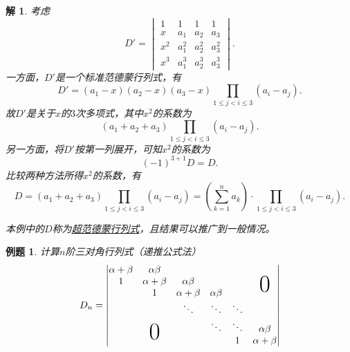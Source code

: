 \documentclass[a4paper]{book}
\newtheorem{eg}{例题}[chapter]
\newtheorem*{solution}{解}
\begin{document}
\begin{solution}
考虑
$$D' = \begin{vmatrix}
1 & 1 & 1 & 1 \\ x &  a_1 & a_2 & a_3 \\ x^2 & a_1^2 & a_2^2 & a_3^2 \\ x^3 & a_1^3 & a_2^3 & a_3^3
\end{vmatrix}.$$
一方面，$D'$是一个标准范德蒙行列式，有
$$D' = (a_1-x)(a_2-x)(a_3-x)\prod_{1\leqslant j < i \leqslant 3} (a_i - a_j).$$
故$D'$是关于$x$的$3$次多项式，其中$x^2$的系数为
$$(a_1+a_2+a_3)\prod_{1\leqslant j < i \leqslant 3} (a_i - a_j).$$
另一方面，将$D'$按第一列展开，可知$x^2$的系数为
$$(-1)^{3+1}D = D.$$
比较两种方法所得$x^2$的系数，有
$$D = (a_1+a_2+a_3)\prod_{1\leqslant j < i \leqslant 3} (a_i - a_j) = \left(\sum\limits_{k=1}^n a_k\right)\cdot\prod_{1\leqslant j < i \leqslant 3} (a_i - a_j).$$

本例中的$D$称为\underline{超范德蒙行列式}，且结果可以推广到一般情况。
\end{solution}

\begin{eg}
计算$n$阶三对角行列式（递推公式法）
$$D_n = \begin{vmatrix}
\alpha + \beta & \alpha\beta & & & & \\ 1 & \alpha + \beta & \alpha\beta & & & \makebox(0,0){\text{\Huge0}} \\ & 1 & \alpha + \beta & \alpha\beta & & \\ & & \ddots & \ddots & \ddots & \\ & \makebox(0,0){\text{\Huge0}} & & \ddots & \ddots & \alpha\beta \\ & & & & 1 & \alpha + \beta
\end{vmatrix}$$
\end{eg}
\end{document}
